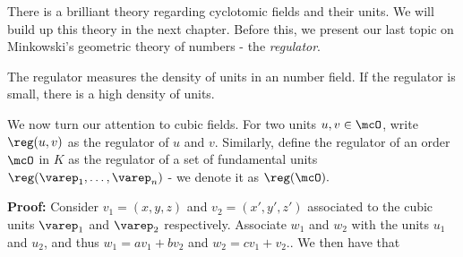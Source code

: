 \documentclass[a4paper, 12pt,oneside,openany]{book}
\begin{document}
There is a brilliant theory regarding cyclotomic fields and their units. We will build up this theory in the next chapter. Before this, we present our last topic on Minkowski's geometric theory of numbers - the \emph{regulator}.


The regulator measures the density of units in an number field. If the regulator is small, there is a high density of units. 

We now turn our attention to cubic fields. For two units $u, v \in \mcO$, write $\reg(u, v)$ as the regulator of $u$ and $v.$ Similarly, define the regulator of an order $\mcO$ in $K$ as the regulator of a set of fundamental units $\reg(\varep_1, \dots, \varep_n)$ - we denote it as $\reg(\mcO).$


\textbf{Proof:} Consider $v_1=(x, y, z)$ and $v_2=(x', y', z')$ associated to the cubic units $\varep_1$ and $\varep_2$ respectively. Associate $w_1$ and $w_2$ with the units $u_1$ and $u_2$, and thus $w_1=av_1+bv_2$ and $w_2=cv_1+v_2.$. We then have that 
\end{document}
